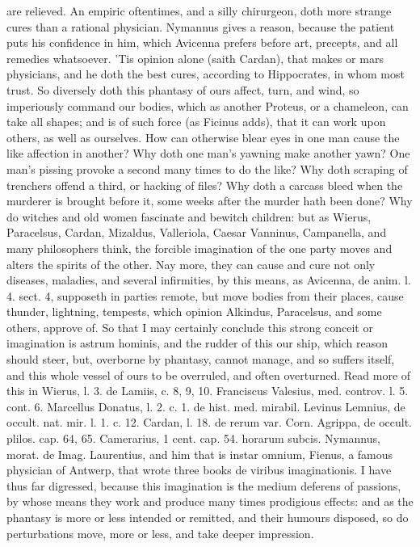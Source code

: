 {are relieved. An empiric oftentimes, and a silly chirurgeon, doth more
strange cures than a rational physician. Nymannus gives a reason,
because the patient puts his confidence in him,  which Avicenna
prefers before art, precepts, and all remedies whatsoever. 'Tis opinion
alone (saith Cardan), that makes or mars physicians, and he doth
the best cures, according to Hippocrates, in whom most trust. So
diversely doth this phantasy of ours affect, turn, and wind, so
imperiously command our bodies, which as another Proteus, or a
chameleon, can take all shapes; and is of such force (as Ficinus adds),
that it can work upon others, as well as ourselves. How can otherwise
blear eyes in one man cause the like affection in another? Why doth one
man's yawning make another yawn? One man's pissing provoke a
second many times to do the like? Why doth scraping of trenchers offend
a third, or hacking of files? Why doth a carcass bleed when the
murderer is brought before it, some weeks after the murder hath been
done? Why do witches and old women fascinate and bewitch children: but
as Wierus, Paracelsus, Cardan, Mizaldus, Valleriola, Caesar Vanninus,
Campanella, and many philosophers think, the forcible imagination of
the one party moves and alters the spirits of the other. Nay more, they
can cause and cure not only diseases, maladies, and several
infirmities, by this means, as Avicenna, de anim. l. 4. sect. 4,
supposeth in parties remote, but move bodies from their places, cause
thunder, lightning, tempests, which opinion Alkindus, Paracelsus, and
some others, approve of. So that I may certainly conclude this strong
conceit or imagination is astrum hominis, and the rudder of this our
ship, which reason should steer, but, overborne by phantasy, cannot
manage, and so suffers itself, and this whole vessel of ours to be
overruled, and often overturned. Read more of this in Wierus, l. 3. de
Lamiis, c. 8, 9, 10. Franciscus Valesius, med. controv. l. 5. cont. 6.
Marcellus Donatus, l. 2. c. 1. de hist. med. mirabil. Levinus Lemnius,
de occult. nat. mir. l. 1. c. 12. Cardan, l. 18. de rerum var. Corn.
Agrippa, de occult. plilos. cap. 64, 65. Camerarius, 1 cent. cap. 54.
horarum subcis. Nymannus, morat. de Imag. Laurentius, and him that is
instar omnium, Fienus, a famous physician of Antwerp, that wrote three
books de viribus imaginationis. I have thus far digressed, because this
imagination is the medium deferens of passions, by whose means they
work and produce many times prodigious effects: and as the phantasy is
more or less intended or remitted, and their humours disposed, so do
perturbations move, more or less, and take deeper impression.

}
